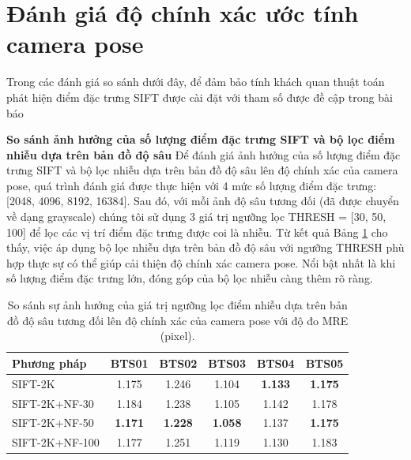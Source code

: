     
\section{Đánh giá độ chính xác ước tính camera pose}
\label{sec:eval_pose}
Trong các đánh giá so sánh dưới đây, để đảm bảo tính khách quan thuật toán phát hiện điểm đặc trưng SIFT được cài đặt với tham số được đề cập trong bài báo \cite{Lowe04Distinctive}

\textbf{So sánh ảnh hưởng của số lượng điểm đặc trưng SIFT và bộ lọc điểm nhiễu dựa trên bản đồ độ sâu}
    Để đánh giá ảnh hưởng của số lượng điểm đặc trưng SIFT và bộ lọc nhiễu dựa trên bản đồ độ sâu lên độ chính xác của camera pose, quá trình đánh giá được thực hiện với 4 mức số lượng điểm đặc trưng: [2048, 4096, 8192, 16384]. Sau đó, với mỗi ảnh độ sâu tương đối (đã được chuyển về dạng grayscale) chúng tôi sử dụng 3 giá trị ngưỡng lọc THRESH = [30, 50, 100] để lọc các vị trí điểm đặc trưng được coi là nhiễu. 
    Từ kết quả Bảng \ref{tab:sift_comparison} cho thấy, việc áp dụng bộ lọc nhiễu dựa trên bản đồ độ sâu với ngưỡng THRESH phù hợp thực sự có thể giúp cải thiện độ chính xác camera pose. Nổi bật nhất là khi số lượng điểm đặc trưng lớn, đóng góp của bộ lọc nhiễu càng thêm rõ ràng.
    \begin{table}[ht]
        \centering
        \footnotesize
        \begin{tabular}{|l|c|c|c|c|c|}
        \hline
        \textbf{Phương pháp} & \textbf{BTS01} & \textbf{BTS02} & \textbf{BTS03} & \textbf{BTS04} & \textbf{BTS05} \\
        \hline
        SIFT-2K & 1.175 & 1.246 & 1.104 & \textbf{1.133} & \textbf{1.175} \\
        SIFT-2K+NF-30 & 1.184 & 1.238 & 1.105 & 1.142 & 1.178 \\
        SIFT-2K+NF-50 & \textbf{1.171} & \textbf{1.228} & \textbf{1.058} & 1.137 & \textbf{1.175} \\
        SIFT-2K+NF-100 & 1.177 & 1.251 & 1.119 & 1.130 & 1.183 \\
        \hline
        \end{tabular}
        \caption{So sánh sự ảnh hưởng của giá trị ngưỡng lọc điểm nhiễu dựa trên bản đồ độ sâu tương đối lên độ chính xác của camera pose với độ đo MRE (pixel).}
        \label{tab:sift_comparison}
    \end{table}

